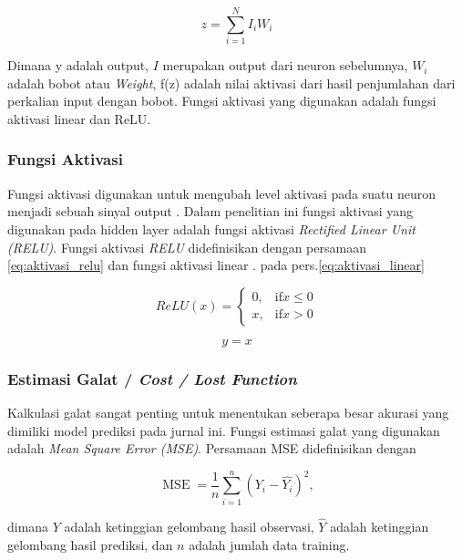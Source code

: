 \begin{equation}
\label{eq:mcullochNeuralNetwork}
    z = \sum_{i=1}^N I_iW_i
\end{equation}

Dimana y adalah output, $I$ merupakan output dari neuron sebelumnya, $W_{i}$ adalah bobot atau \emph{Weight}, f(z) adalah nilai aktivasi dari hasil penjumlahan dari perkalian input dengan bobot. Fungsi aktivasi yang digunakan adalah fungsi aktivasi linear dan ReLU. 

\subsubsection{Fungsi Aktivasi}

Fungsi aktivasi digunakan untuk mengubah level aktivasi pada suatu neuron menjadi sebuah sinyal output \cite{KarlicOlgacPerformanceAnalysis}. Dalam penelitian ini fungsi aktivasi yang digunakan pada hidden layer adalah  fungsi aktivasi \emph{Rectified Linear Unit (RELU)}\cite{glorot2011deep}. Fungsi aktivasi \emph{RELU} didefinisikan dengan persamaan \ref{eq:aktivasi_relu}  dan fungsi aktivasi linear \cite{MLBishop}. pada pers.\ref{eq:aktivasi_linear}

\begin{equation} 
    \label{eq:aktivasi_relu}
ReLU (x)=\begin{cases} 0, & \mbox{if} x\le 0 \\ x, & \mbox{if} x > 0 \end{cases}
\end{equation}

\begin{equation}
    \label{eq:aktivasi_linear}
    y=x
\end{equation}


\subsubsection{Estimasi Galat / \emph{Cost / Lost Function}}

Kalkulasi galat sangat penting untuk menentukan seberapa besar akurasi yang dimiliki model prediksi pada jurnal ini. Fungsi estimasi galat yang digunakan adalah \emph{Mean Square Error (MSE)}. Persamaan MSE didefinisikan dengan

\begin{equation}
    \operatorname{MSE}=\frac{1}{n}\sum_{i=1}^n(Y_i-\hat{Y_i})^2,
\end{equation}

dimana $Y$ adalah ketinggian gelombang hasil observasi, $\hat{Y}$ adalah ketinggian gelombang hasil prediksi, dan $n$ adalah jumlah data training.


